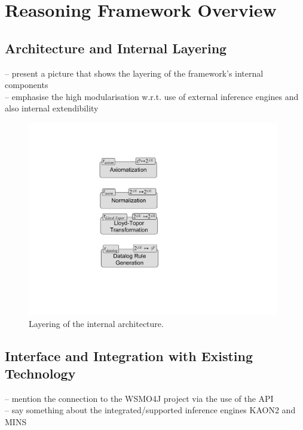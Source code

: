 \section{Reasoning Framework Overview\label{sec:framework}}

\subsection{Architecture and Internal Layering}
-- present a picture that shows the layering of the framework's internal components \\
-- emphasise the high modularisation w.r.t. use of external inference engines and also internal extendibility \\

\begin{figure}[h]
        \includegraphics[width=11cm]{figures/layering}
        \centering
    \caption{Layering of the internal architecture. \label{fig:layering}}
\end{figure}


\subsection{Interface and Integration with Existing Technology}
-- mention the connection to the WSMO4J project via the use of the API \\
-- say something about the integrated/supported inference engines KAON2 and MINS \\
